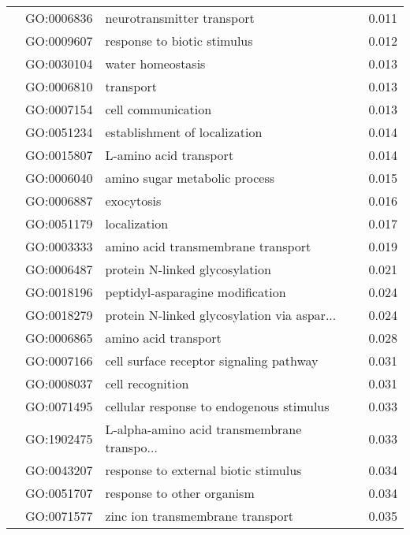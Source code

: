 \begin{longtable}{lllr}
   & GO:0006836 &                   neurotransmitter transport &         0.011 \\
   & GO:0009607 &                  response to biotic stimulus &         0.012 \\
   & GO:0030104 &                            water homeostasis &         0.013 \\
   & GO:0006810 &                                    transport &         0.013 \\
   & GO:0007154 &                           cell communication &         0.013 \\
   & GO:0051234 &                establishment of localization &         0.014 \\
   & GO:0015807 &                       L-amino acid transport &         0.014 \\
   & GO:0006040 &                amino sugar metabolic process &         0.015 \\
   & GO:0006887 &                                   exocytosis &         0.016 \\
   & GO:0051179 &                                 localization &         0.017 \\
   & GO:0003333 &           amino acid transmembrane transport &         0.019 \\
   & GO:0006487 &               protein N-linked glycosylation &         0.021 \\
   & GO:0018196 &             peptidyl-asparagine modification &         0.024 \\
   & GO:0018279 &  protein N-linked glycosylation via aspar... &         0.024 \\
   & GO:0006865 &                         amino acid transport &         0.028 \\
   & GO:0007166 &      cell surface receptor signaling pathway &         0.031 \\
   & GO:0008037 &                             cell recognition &         0.031 \\
   & GO:0071495 &     cellular response to endogenous stimulus &         0.033 \\
   & GO:1902475 &  L-alpha-amino acid transmembrane transpo... &         0.033 \\
   & GO:0043207 &         response to external biotic stimulus &         0.034 \\
   & GO:0051707 &                   response to other organism &         0.034 \\
   & GO:0071577 &             zinc ion transmembrane transport &         0.035 \\

\end{longtable}

